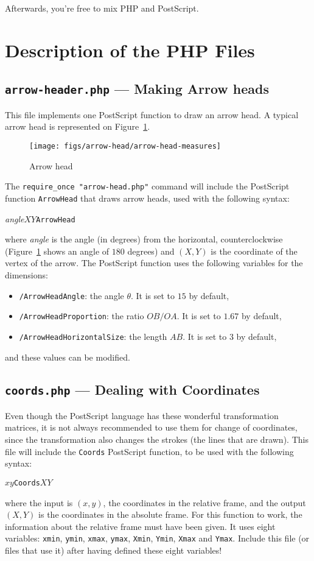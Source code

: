 \documentclass[10pt,a4paper]{scrartcl}
\newcommand\code[1]{\lstinline{#1}}
\newcommand\PS{PostScript}
\begin{document}
Afterwards, you're free to mix PHP and \PS.

\section{Description of the PHP Files}
\subsection{\texttt{arrow-header.php} --- Making Arrow heads}
This file implements one \PS{} function to draw an arrow head.
A typical arrow head is represented on Figure~\ref{fig:arrow-head-explained}.
\begin{figure}[ht!]%
\centering
\texttt{[image: figs/arrow-head/arrow-head-measures]}%
\caption{Arrow head}%
\label{fig:arrow-head-explained}
\end{figure}

The \code{require_once "arrow-head.php"} command will include the \PS{} function
\texttt{ArrowHead} that draws arrow heads, used with the following syntax:
\begin{center}
\textit{angle}\quad$X$\quad$Y$\quad\texttt{ArrowHead}
\end{center}
where \textit{angle} is the angle (in degrees) from the horizontal,
counterclockwise (Figure~\ref{fig:arrow-head-explained} shows an angle of $180$
degrees) and $(X,Y)$ is the coordinate of the vertex of the arrow.
The \PS{} function uses the following variables for the dimensions:
\begin{itemize}
\item \texttt{/ArrowHeadAngle}: the angle $\theta$. It is set to $15$ by default,
\item \texttt{/ArrowHeadProportion}: the ratio $OB/OA$. It is set to $1.67$ by default,
\item \texttt{/ArrowHeadHorizontalSize}: the length $AB$. It is set to $3$ by default,
\end{itemize}
and these values can be modified.

\subsection{\texttt{coords.php} --- Dealing with Coordinates}
Even though the \PS{} language has these wonderful transformation matrices, it
is not always recommended to use them for change of coordinates, since the
transformation also changes the strokes (the lines that are drawn). This file
will include the \texttt{Coords} \PS{} function, to be used with the following
syntax:
\begin{center}
$x$\quad$y$\quad\texttt{Coords}\quad$X$\quad$Y$
\end{center}
where the input is $(x,y)$, the coordinates in the relative frame, and the output $(X,Y)$
is the coordinates in the absolute frame. For this function to work, the information about
the relative frame must have been given. It uses eight variables:
\texttt{xmin}, \texttt{ymin}, \texttt{xmax}, \texttt{ymax},
\texttt{Xmin}, \texttt{Ymin}, \texttt{Xmax} and \texttt{Ymax}.
Include this file (or files that use it) after having defined
these eight variables!
\end{document}
